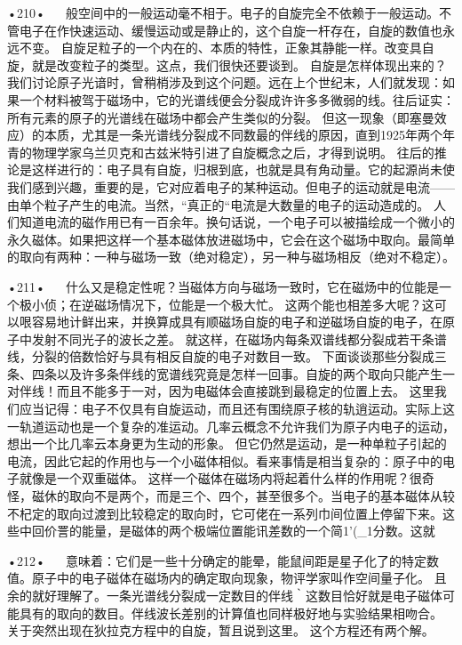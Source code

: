 •210•
  
般空间中的一般运动毫不相于。电子的自旋完全不依赖于一般运动。不管电子在作快速运动、缓慢运动或是静止的，这个自旋一杆存在，自旋的数值也永远不变。
自旋足粒子的一个内在的、本质的特性，正象其静能一样。改变具自旋，就是改变粒子的类型。这点，我们很快还要谈到。
自旋是怎样体现出来的？我们讨论原子光谙时，曾稍梢涉及到这个问题。远在上个世纪末，人们就发现：如果一个材料被驾于磁场中，它的光谱线便会分裂成许许多多微弱的线。往后证实：所有元素的原子的光谱线在磁场中都会产生类似的分裂。
但这一现象（即塞曼效应）的本质，尤其是一条光谱线分裂成不同数最的伴线的原因，直到1925年两个年青的物理学家乌兰贝克和古兹米特引进了自旋概念之后，才得到说明。
往后的推论是这样进行的：电子具有自旋，归根到底，也就是具有角动量。它的起源尚未使我们感到兴趣，重要的是，它对应着电子的某种运动。但电子的运动就是电流——由单个粒子产生的电流。当然，“真正的“电流是大数量的电子的运动造成的。
人们知道电流的磁作用已有一百余年。换句话说，一个电子可以被描绘成一个微小的永久磁体。如果把这样一个基本磁体放进磁场中，它会在这个磁场中取向。最简单的取向有两种：一种与磁场一致（绝对稳定），另一种与磁场相反（绝对不稳定）。

•211•
  
什么又是稳定性呢？当磁体方向与磁场一致时，它在磁炀中的位能是一个极小侦；在逆磁场情况下，位能是一个极大忙。
这两个能也相差多大呢？这可以哏容易地计鲜出来，并换算成具有顺磁场自旋的电子和逆磁场自旋的电子，在原子中发射不同光子的波长之差。
就这样，在磁场内每条双谱线都分裂成若干条谱线，分裂的倍数恰好与具有相反自旋的电子对数目一致。
下面谈谈那些分裂成三条、四条以及许多条伴线的宽谱线究竟是怎样一回事。自旋的两个取向只能产生一对伴线！而且不能多于一对，因为电磁体会直接跳到最稳定的位置上去。
这里我们应当记得：电子不仅具有自旋运动，而且还有围绕原子核的轨逍运动。实际上这一轨道运动也是一个复杂的准运动。几率云概念不允许我们为原子内电子的运动，想出一个比几率云本身更为生动的形象。
但它仍然是运动，是一种单粒子引起的电流，因此它起的作用也与一个小磁体相似。看来事情是相当复杂的：原子中的电子就像是一个双重磁体。
这样一个磁体在磁场内将起着什么样的作用呢？很奇怪，磁休的取向不是两个，而是三个、四个，甚至很多个。当电子的基本磁体从较不杞定的取向过渡到比较稳定的取向时，它可佬在一系列巾间位置上停留下来。这些中回价詈的能量，是磁体的两个极端位置能讯差数的一个简1'(_1分数。这就

•212•
  
意味着：它们是一些十分确定的能晕，能鼠间距是星子化了的特定数值。原子中的电子磁体在磁场内的确定取向现象，物评学家叫作空间量子化。
且余的就好理解了。一条光谱线分裂成一定数目的伴线｀这数目恰好就是电子磁体可能具有的取向的数目。伴线波长差别的计算值也同样极好地与实验结果相吻合。
关于突然出现在狄拉克方程中的自旋，暂且说到这里。
这个方程还有两个解。

